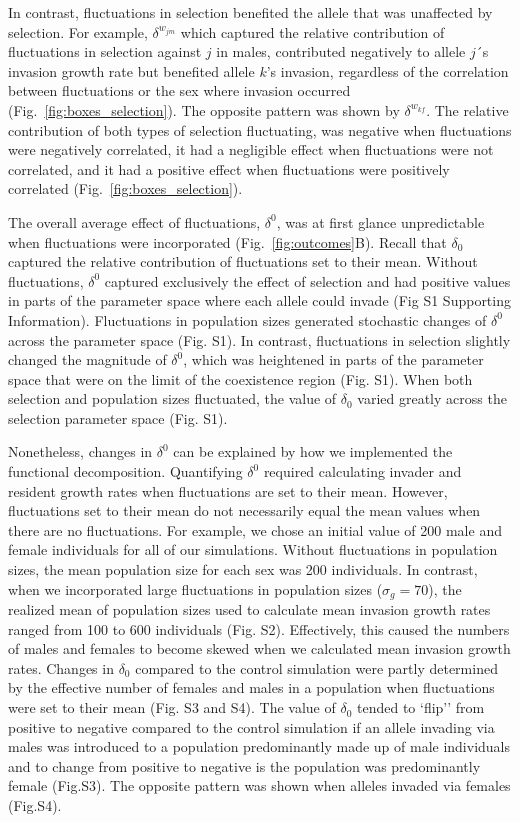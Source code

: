 In contrast, fluctuations in selection benefited the allele that was unaffected by selection. For example, $\delta^{w_{jm}}$ which captured the relative contribution of fluctuations in selection against $j$ in males, contributed negatively to allele $j$´s invasion growth rate but benefited allele $k$'s invasion, regardless of the correlation between fluctuations or the sex where invasion occurred (Fig.~\ref{fig:boxes_selection}). The opposite pattern was shown by $\delta^{w_{kf}}$. The relative contribution of both types of selection fluctuating, was negative when fluctuations were negatively correlated, it had a negligible effect when fluctuations were not correlated, and it had a positive effect when fluctuations were positively correlated (Fig.~\ref{fig:boxes_selection}).

The overall average effect of fluctuations, $\delta^{0}$, was at first glance unpredictable when fluctuations were incorporated (Fig.~\ref{fig:outcomes}B). Recall that $\delta_{0}$ captured the relative contribution of fluctuations set to their mean. Without fluctuations, $\delta^{0}$ captured exclusively the effect of selection and had positive values in parts of the parameter space where each allele could invade (Fig S1 Supporting Information). Fluctuations in population sizes generated stochastic changes of $\delta^{0}$ across the parameter space (Fig. S1). In contrast, fluctuations in selection slightly changed the magnitude of $\delta^{0}$,  which was heightened in parts of the parameter space that were on the limit of the coexistence region (Fig. S1). When both selection and population sizes fluctuated, the value of $\delta_{0}$ varied greatly across the selection parameter space (Fig. S1).


Nonetheless, changes in $\delta^{0}$  can be explained by how we implemented the functional decomposition. Quantifying $\delta^{0}$ required calculating invader and resident growth rates when fluctuations are set to their mean. However, fluctuations set to their mean do not necessarily equal the mean values when there are no fluctuations. For example, we chose an initial value of 200 male and female individuals for all of our simulations. Without fluctuations in population sizes, the mean population size for each sex was 200 individuals. In contrast, when we incorporated large fluctuations in population sizes ($\sigma_{g}=70$), the realized mean of population sizes used to calculate mean invasion growth rates ranged from 100 to 600 individuals (Fig. S2). Effectively, this caused the numbers of males and females to become skewed when we calculated mean invasion growth rates. Changes in $\delta_{0}$ compared to the control simulation were partly determined by the effective number of females and males in a population when fluctuations were set to their mean (Fig. S3 and S4). The value of $\delta_{0}$ tended to `flip'' from positive to negative compared to the control simulation if an allele invading via males was introduced to a population predominantly made up of male individuals and to change from positive to negative is the population was predominantly female (Fig.S3). The opposite pattern was shown when alleles invaded via females (Fig.S4).

